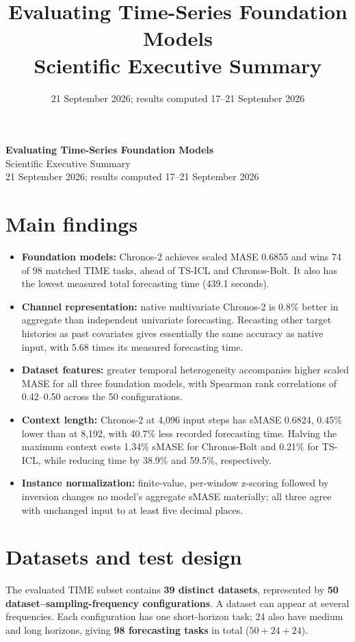 \documentclass[11pt,a4paper]{article}
\title{\textbf{Evaluating Time-Series Foundation Models}\\Scientific Executive Summary}
\author{}
\date{21 September 2026; results computed 17--21 September 2026}
\begin{document}
\begin{center}
{\Large\bfseries Evaluating Time-Series Foundation Models}\\[4pt]
{\large Scientific Executive Summary}\\[5pt]
{\small 21 September 2026; results computed 17--21 September 2026}
\end{center}

\section*{Main findings}
\begin{itemize}
\item \textbf{Foundation models:} Chronos-2 achieves scaled MASE 0.6855
and wins 74 of 98 matched TIME tasks, ahead of TS-ICL and Chronos-Bolt.
It also has the lowest measured total forecasting time (439.1 seconds).
\item \textbf{Channel representation:} native multivariate Chronos-2 is
0.8\% better in aggregate than independent univariate forecasting.
Recasting other target histories as past covariates gives essentially the
same accuracy as native input, with 5.68 times its measured forecasting time.
\item \textbf{Dataset features:} greater temporal heterogeneity accompanies
higher scaled MASE for all three foundation models, with Spearman rank
correlations of 0.42--0.50 across the 50 configurations.
\item \textbf{Context length:} Chronos-2 at 4,096 input steps has sMASE
0.6824, 0.45\% lower than at 8,192, with 40.7\% less recorded forecasting
time. Halving the maximum context costs 1.34\% sMASE for Chronos-Bolt and
0.21\% for TS-ICL, while reducing time by 38.9\% and 59.5\%, respectively.
\item \textbf{Instance normalization:} finite-value, per-window z-scoring
followed by inversion changes no model's aggregate sMASE materially;
all three agree with unchanged input to at least five decimal places.
\end{itemize}

\section{Datasets and test design}
The evaluated TIME subset contains \textbf{39 distinct datasets}, represented
by \textbf{50 dataset--sampling-frequency configurations}. A dataset can
appear at several frequencies. Each configuration has one short-horizon task;
24 also have medium and long horizons, giving \textbf{98 forecasting tasks}
in total ($50+24+24$).
\end{document}
